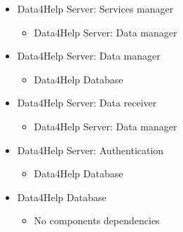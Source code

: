 \documentclass[../DD.tex]{subfiles}
\begin{document}
\begin{itemize}
			\item{Data4Help Server: Services manager}
			\begin{itemize}\item{Data4Help Server: Data manager}\end{itemize}

			\item{Data4Help Server: Data manager}
			\begin{itemize}\item{Data4Help Database}\end{itemize}

			\item{Data4Help Server: Data receiver}
			\begin{itemize}\item{Data4Help Server: Data manager}\end{itemize}

			\item{Data4Help Server: Authentication}
			\begin{itemize}\item{Data4Help Database}\end{itemize}

			\item{Data4Help Database}
			\begin{itemize}\item{No components dependencies}\end{itemize}
			
		\end{itemize}
\end{document}
